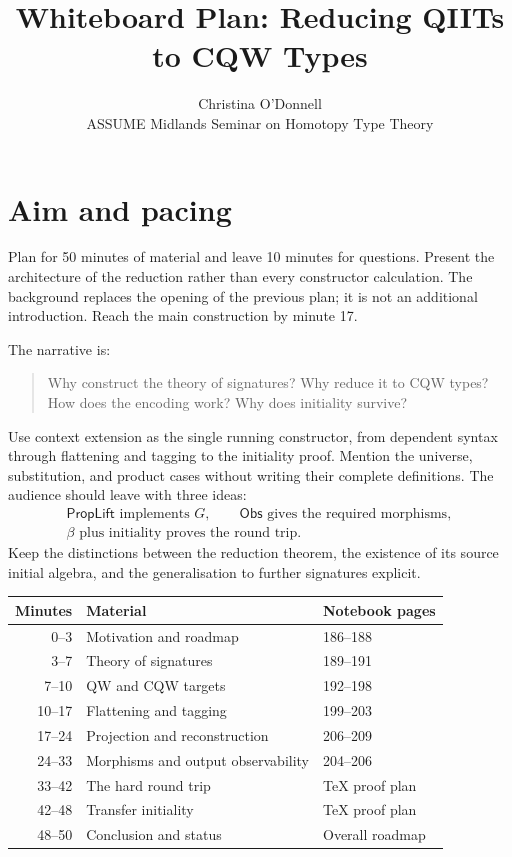 \documentclass[11pt]{article}
\title{Whiteboard Plan: Reducing QIITs to CQW Types}
\author{Christina O'Donnell\\ASSUME Midlands Seminar on Homotopy Type Theory}
\date{}
\newcommand{\Obs}{\mathsf{Obs}}
\newcommand{\PropLift}{\mathsf{PropLift}}
\begin{document}
\maketitle

\section*{Aim and pacing}

Plan for 50 minutes of material and leave 10 minutes for questions. Present
the architecture of the reduction rather than every constructor calculation.
The background replaces the opening of the previous plan; it is not an
additional introduction. Reach the main construction by minute 17.

The narrative is:
\begin{quote}
Why construct the theory of signatures? Why reduce it to CQW types?
How does the encoding work? Why does initiality survive?
\end{quote}
Use context extension as the single running constructor, from dependent
syntax through flattening and tagging to the initiality proof. Mention the
universe, substitution, and product cases without writing their complete
definitions. The audience should leave with three ideas:
\[
\begin{gathered}
  \PropLift\text{ implements }G,
  \qquad \Obs\text{ gives the required morphisms},\\
  \beta\text{ plus initiality proves the round trip}.
\end{gathered}
\]
Keep the distinctions between the reduction theorem, the existence of its
source initial algebra, and the generalisation to further signatures explicit.

\begin{center}
\small
\begin{tabularx}{\linewidth}{@{}r X l@{}}
\textbf{Minutes} & \textbf{Material} & \textbf{Notebook pages}\\\hline
0--3 & Motivation and roadmap & 186--188\\
3--7 & Theory of signatures & 189--191\\
7--10 & QW and CQW targets & 192--198\\
10--17 & Flattening and tagging & 199--203\\
17--24 & Projection and reconstruction & 206--209\\
24--33 & Morphisms and output observability & 204--206\\
33--42 & The hard round trip & TeX proof plan\\
42--48 & Transfer initiality & TeX proof plan\\
48--50 & Conclusion and status & Overall roadmap
\end{tabularx}
\end{center}
\end{document}
